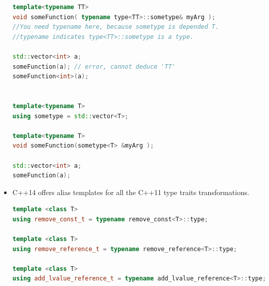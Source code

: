 \documentclass[a4paper,11pt,twoside]{book}
\begin{document}
\begin{itemize}
\begin{lstlisting}[frame=single, language=c++]
template<typename TT>
void someFunction( typename type<TT>::sometype& myArg );
//You need typename here, because sometype is depended T.
//typename indicates type<TT>::sometype is a type.

std::vector<int> a;
someFunction(a); // error, cannot deduce 'TT'
someFunction<int>(a);


template<typename T>
using sometype = std::vector<T>;

template<typename T>
void someFunction(sometype<T> &myArg );

std::vector<int> a;
someFunction(a);
\end{lstlisting}

\item C++14 offers alias templates for all the C++11 type traits transformations.
\begin{lstlisting}[frame=single, language=c++]
template <class T>
using remove_const_t = typename remove_const<T>::type;

template <class T>
using remove_reference_t = typename remove_reference<T>::type;

template <class T>
using add_lvalue_reference_t = typename add_lvalue_reference<T>::type;
\end{lstlisting}

\end{itemize}
\end{document}

